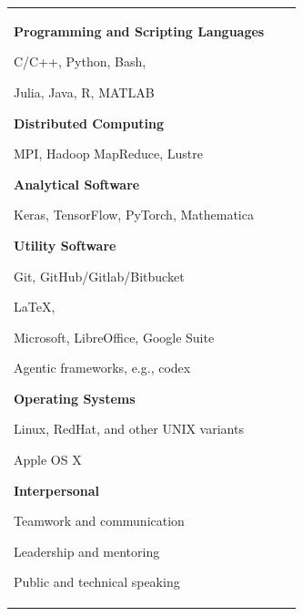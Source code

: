 \begin{tabular}[t]{@{}p{\textwidth-\rcollength-3.5\spacewidth}@{}p{\spacewidth}@{}p{\rcollength}}
\parbox{\textwidth-\rcollength-\spacewidth}{%
\textbf{Programming and Scripting Languages}
\begin{innerlist}
	\item[] C/C++, Python, Bash, 
	\item[] Julia, Java, R, MATLAB
\end{innerlist}
\textbf{Distributed Computing}
\begin{innerlist}
	\item[] MPI, Hadoop MapReduce, Lustre
\end{innerlist}
%
\textbf{Analytical Software}
\begin{innerlist}
	\item[] Keras, TensorFlow, PyTorch, Mathematica
\end{innerlist}
%
\textbf{Utility Software}
\begin{innerlist}
	\item[] Git, GitHub/Gitlab/Bitbucket
	\item[] \LaTeX{}, \BibTeX
	\item[] Microsoft, LibreOffice, Google Suite 
	\item[] Agentic frameworks, e.g., codex
\end{innerlist}
%
\textbf{Operating Systems}
\begin{innerlist}
    \item[] Linux, RedHat, and other UNIX variants
    \item[] Apple OS X
\end{innerlist}
%
\textbf{Interpersonal}
\begin{innerlist}
	\item[] Teamwork and communication
	\item[] Leadership and mentoring
	\item[] Public and technical speaking
\end{innerlist}
}


\end{tabular}